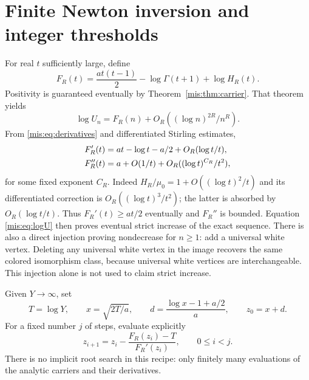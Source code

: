 \documentclass[11pt]{article}
\theoremstyle{remark}\newtheorem{remark}[theorem]{Remark}
\begin{document}
\section{Finite Newton inversion and integer thresholds}
For real $t$ sufficiently large, define
\begin{equation}\label{mis:eq:FR}
 F_R(t)=\frac{a t(t-1)}2-\log\Gamma(t+1)+\log H_R(t).
\end{equation}
Positivity is guaranteed eventually by Theorem~\ref{mis:thm:carrier}. That theorem yields
\begin{equation}\label{mis:eq:logU}
 \log U_n=F_R(n)+O_R((\log n)^{2R}/n^R).
\end{equation}
From \eqref{mis:eq:derivatives} and differentiated Stirling estimates,
\begin{align}
 F_R'(t)&=at-\log t-a/2+O_R(\log t/t),\notag\\
 F_R''(t)&=a+O(1/t)+O_R((\log t)^{C_R}/t^2),\label{mis:eq:Fder}
\end{align}
for some fixed exponent $C_R$. Indeed $H_R/\mu_0=1+O((\log t)^2/t)$ and its differentiated correction is $O_R((\log t)^3/t^2)$; the latter is absorbed by $O_R(\log t/t)$. Thus $F_R'(t)\ge at/2$ eventually and $F_R''$ is bounded. Equation \eqref{mis:eq:logU} then proves eventual strict increase of the exact sequence. There is also a direct injection proving nondecrease for $n\ge1$: add a universal white vertex. Deleting any universal white vertex in the image recovers the same colored isomorphism class, because universal white vertices are interchangeable. This injection alone is not used to claim strict increase.

Given $Y\to\infty$, set
\begin{equation}\label{mis:eq:x-d}
 T=\log Y,\qquad x=\sqrt{2T/a},\qquad
 d=\frac{\log x-1+a/2}{a},\qquad z_0=x+d.
\end{equation}
For a fixed number $j$ of steps, evaluate explicitly
\begin{equation}\label{mis:eq:newton}
 z_{i+1}=z_i-\frac{F_R(z_i)-T}{F_R'(z_i)},\qquad 0\le i<j.
\end{equation}
There is no implicit root search in this recipe: only finitely many evaluations of the analytic carriers and their derivatives.
\end{document}
